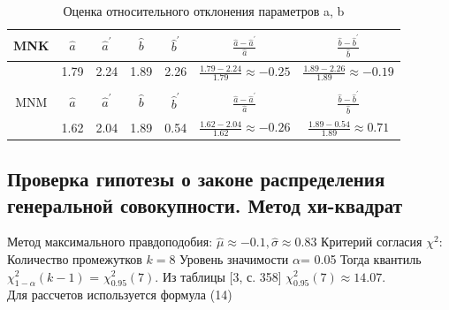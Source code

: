 \documentclass[a4paper]{article}
\begin{document}
  \begin{table}[H]
		\centering
		\begin{tabular}{| c | c | c | c | c | c | c | }
			
			\hline
 MNK & $\hat{a}$ & $\hat{a}^'$ & $\hat{b}$ & $\hat{b}^'$ & $\frac{\hat{a}-\hat{a}^'}{\hat{a}}$ & $\frac{\hat{b}-\hat{b}^'}{\hat{b}}$\\
\hline
 & 1.79 & 2.24 & 1.89 & 2.26 & $\frac{1.79-2.24}{1.79} \approx -0.25$ & $\frac{1.89-2.26}{1.89} \approx -0.19$\\
 \hline
  & & & & & & \\
  \hline
  MNM & $\hat{a}$ & $\hat{a}^'$ & $\hat{b}$ & $\hat{b}^'$ & $\frac{\hat{a}-\hat{a}^'}{\hat{a}}$ & $\frac{\hat{b}-\hat{b}^'}{\hat{b}}$\\
\hline
 & 1.62 & 2.04 & 1.89 & 0.54 & $\frac{1.62-2.04}{1.62} \approx -0.26$ & $\frac{1.89-0.54}{1.89} \approx 0.71$\\
 \hline
			
		\end{tabular}{}
		\caption{Оценка относительного отклонения параметров a, b}
		\label{tab:n20}
	\end{table}
 
\subsection{Проверка гипотезы о законе распределения генеральной совокупности. Метод хи-квадрат}

\noindent Метод максимального правдоподобия:
\newline
$\hat{\mu} \approx -0.1, \hat{\sigma} \approx 0.83$
\newline
Критерий согласия $\chi^{2}$:
\newline
Количество промежутков $k = 8$
\newline
Уровень значимости $\alpha$= 0.05
\newline
Тогда квантиль $\chi^{2}_{1-\alpha}(k-1)$ = $\chi^{2}_{0.95}(7)$. Из таблицы [3, с. 358] $\chi^{2}_{0.95}(7) \approx 14.07$. \\
Для рассчетов используется формула (14)
\end{document}
